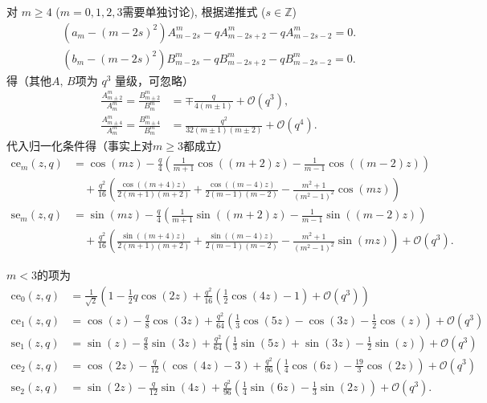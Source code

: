 对 \(m\geq4\) (\(m = 0, 1, 2, 3\)需要单独讨论), 根据递推式 (\(s \in \mathbb{Z}\))
\begin{align*}
	(a_m - (m - 2s)^2) A_{m-2s}^m - q A_{m-2s+2}^m - q A_{m-2s-2}^m = 0.
\end{align*}
\begin{align*}
	(b_m - (m - 2s)^2) B_{m-2s}^m - q B_{m-2s+2}^m - q B_{m-2s-2}^m = 0.
\end{align*}
得（其他\(A,\,B\)项为 \(q^3\) 量级，可忽略）
\begin{align*}
	\frac{A_{m\pm2}^m}{A_m^m} = \frac{B_{m\pm2}^m}{B_m^m} & = \mp \frac{q}{4(m\pm1)} + \mathcal{O}(q^3),       \\
	\frac{A_{m\pm4}^m}{A_m^m} = \frac{B_{m\pm4}^m}{B_m^m} & = \frac{q^2}{32(m\pm1)(m\pm2)} + \mathcal{O}(q^4).
\end{align*}
代入归一化条件得（事实上对\(m\geq3\)都成立）
\begin{align*}
	\mathrm{ce}_m(z, q) & = \cos(mz) - \frac{q}{4} \left( \frac{1}{m+1}\cos((m+2)z) - \frac{1}{m-1}\cos((m-2)z) \right)                                                                      \\
	                    & \quad+ \frac{q^2}{16} \left( \frac{\cos((m+4)z)}{2(m+1)(m+2)} + \frac{\cos((m-4)z)}{2(m-1)(m-2)} - \frac{m^2 + 1}{(m^2 - 1)^2}\cos(mz) \right)                     \\[4pt]
	\mathrm{se}_m(z, q) & = \sin(mz) - \frac{q}{4} \left( \frac{1}{m+1}\sin((m+2)z) - \frac{1}{m-1}\sin((m-2)z) \right)                                                                      \\
	                    & \quad+ \frac{q^2}{16} \left( \frac{\sin((m+4)z)}{2(m+1)(m+2)} + \frac{\sin((m-4)z)}{2(m-1)(m-2)} - \frac{m^2 + 1}{(m^2 - 1)^2}\sin(mz) \right) + \mathcal{O}(q^3).
\end{align*}

\(m<3\)的项为
\begin{align*}
	\mathrm{ce}_0(z, q) & = \frac{1}{\sqrt{2}} \left( 1 - \frac12 q\cos(2z) + \frac{q^2}{16} \left( \frac12 \cos(4z) - 1 \right) + \mathcal{O}(q^3) \right)                \\
	\mathrm{ce}_1(z, q) & = \cos(z) - \frac{q}{8}\cos(3z) + \frac{q^2}{64} \left( \frac13 \cos(5z) - \cos(3z) - \frac12 \cos(z) \right) + \mathcal{O}(q^3)                 \\
	\mathrm{se}_1(z, q) & = \sin(z) - \frac{q}{8}\sin(3z) + \frac{q^2}{64} \left( \frac13 \sin(5z) + \sin(3z) - \frac12 \sin(z) \right) + \mathcal{O}(q^3)                 \\
	\mathrm{ce}_2(z, q) & = \cos(2z) - \frac{q}{12} \left( \cos(4z) - 3 \right) + \frac{q^2}{96} \left( \frac14 \cos(6z) - \frac{19}{3}\cos(2z) \right) + \mathcal{O}(q^3) \\
	\mathrm{se}_2(z, q) & = \sin(2z) - \frac{q}{12}\sin(4z) + \frac{q^2}{96} \left( \frac14 \sin(6z) - \frac13 \sin(2z) \right) + \mathcal{O}(q^3).
\end{align*}

